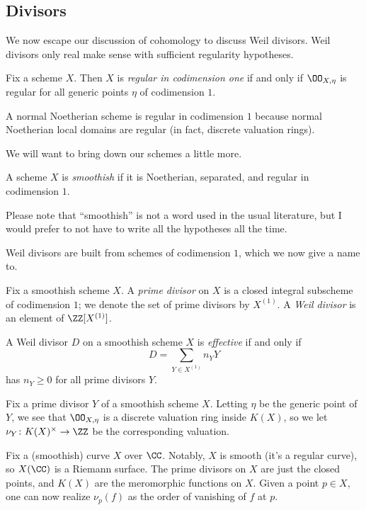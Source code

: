 \documentclass[../notes.tex]{subfiles}
\begin{document}
\subsection{Divisors}
We now escape our discussion of cohomology to discuss Weil divisors. Weil divisors only real make sense with sufficient regularity hypotheses.
\begin{definition}
	Fix a scheme $X$. Then $X$ is \textit{regular in codimension one} if and only if $\OO_{X,\eta}$ is regular for all generic points $\eta$ of codimension $1$.
\end{definition}
\begin{remark}
	A normal Noetherian scheme is regular in codimension $1$ because normal Noetherian local domains are regular (in fact, discrete valuation rings).
\end{remark}
We will want to bring down our schemes a little more.
\begin{definition}[smoothish]
	A scheme $X$ is \textit{smoothish} if it is Noetherian, separated, and regular in codimension $1$.
\end{definition}
Please note that ``smoothish'' is not a word used in the usual literature, but I would prefer to not have to write all the hypotheses all the time.

Weil divisors are built from schemes of codimension $1$, which we now give a name to.
\begin{definition}
	Fix a smoothish scheme $X$. A \textit{prime divisor} on $X$ is a closed integral subscheme of codimension $1$; we denote the set of prime divisors by $X^{(1)}$. A \textit{Weil divisor} is an element of $\ZZ[X^{(1)}]$.
\end{definition}
\begin{definition}[effective]
	A Weil divisor $D$ on a smoothish scheme $X$ is \textit{effective} if and only if
	\[D=\sum_{Y\in X^{(1)}}n_YY\]
	has $n_Y\ge0$ for all prime divisors $Y$.
\end{definition}
\begin{notation}
	Fix a prime divisor $Y$ of a smoothish scheme $X$. Letting $\eta$ be the generic point of $Y$, we see that $\OO_{X,\eta}$ is a discrete valuation ring inside $K(X)$, so we let $\nu_Y\colon K(X)^\times\to\ZZ$ be the corresponding valuation.
\end{notation}
\begin{example}
	Fix a (smoothish) curve $X$ over $\CC$. Notably, $X$ is smooth (it's a regular curve), so $X(\CC)$ is a Riemann surface. The prime divisors on $X$ are just the closed points, and $K(X)$ are the meromorphic functions on $X$. Given a point $p\in X$, one can now realize $\nu_p(f)$ as the order of vanishing of $f$ at $p$.
\end{example}
\end{document}
